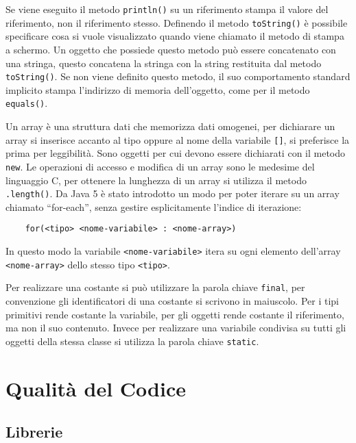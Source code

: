 \documentclass{article}
\numberwithin{equation}{subsection}
\begin{document}
Se viene eseguito il metodo \verb|println()| su un riferimento stampa il valore del riferimento, non il riferimento stesso. Definendo il metodo \verb|toString()| è possibile 
specificare cosa si vuole visualizzato quando viene chiamato il metodo di stampa a schermo. Un oggetto che possiede questo metodo può essere concatenato con una stringa, 
questo concatena la stringa con la string restituita dal metodo \verb|toString()|. 
Se non viene definito questo metodo, il suo comportamento standard implicito stampa l'indirizzo di memoria dell'oggetto, come per il metodo \verb|equals()|. 



Un array è una struttura dati che memorizza dati omogenei, per dichiarare un array si inserisce accanto al tipo oppure al nome della variabile \verb|[]|, si preferisce la prima 
per leggibilità. Sono oggetti per cui devono essere dichiarati con il metodo \verb|new|. Le operazioni di accesso e modifica di un array sono le medesime del linguaggio C, 
per ottenere la lunghezza di un array si utilizza il metodo \verb|.length()|. Da Java 5 è stato introdotto un modo per poter iterare su un array chiamato ``for-each'', senza gestire 
esplicitamente l'indice di iterazione: 
\begin{verbatim}
    for(<tipo> <nome-variabile> : <nome-array>)
\end{verbatim}
In questo modo la variabile \verb|<nome-variabile>| itera su ogni elemento dell'array \verb|<nome-array>| dello stesso tipo \verb|<tipo>|. 


Per realizzare una costante si può utilizzare la parola chiave \verb|final|, per convenzione gli identificatori di una costante si scrivono in maiuscolo. Per i tipi primitivi 
rende costante la variabile, per gli oggetti rende costante il riferimento, ma non il suo contenuto. 
Invece per realizzare una variabile condivisa su tutti gli oggetti della stessa classe si utilizza la parola chiave \verb|static|. 

\clearpage

\section{Qualità del Codice}

\subsection{Librerie}
\end{document}
